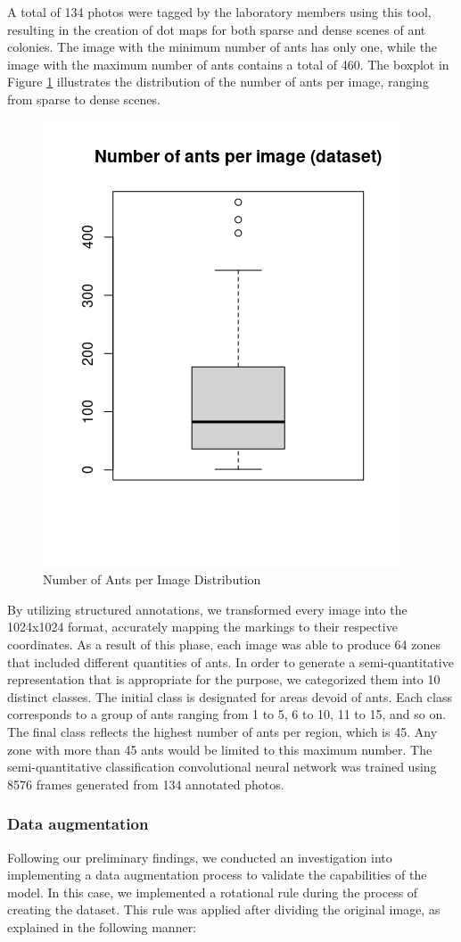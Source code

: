 A total of 134 photos were tagged by the laboratory members using this tool, resulting in the creation of dot maps for both sparse and dense scenes of ant colonies. The image with the minimum number of ants has only one, while the image with the maximum number of ants contains a total of 460. The boxplot in Figure \ref{fig:dataset-boxplot} illustrates the distribution of the number of ants per image, ranging from sparse to dense scenes.

\begin{figure}[h!]
    \centering
    \includegraphics[width = .4\linewidth]{Figures/dataset-boxplot.png}
    \caption{Number of Ants per Image Distribution}
    \label{fig:dataset-boxplot}
\end{figure}

By utilizing structured annotations, we transformed every image into the 1024x1024 format, accurately mapping the markings to their respective coordinates. As a result of this phase, each image was able to produce 64 zones that included different quantities of ants. In order to generate a semi-quantitative representation that is appropriate for the purpose, we categorized them into 10 distinct classes. The initial class is designated for areas devoid of ants. Each class corresponds to a group of ants ranging from 1 to 5, 6 to 10, 11 to 15, and so on. The final class reflects the highest number of ants per region, which is 45. Any zone with more than 45 ants would be limited to this maximum number. The semi-quantitative classification convolutional neural network was trained using 8576 frames generated from 134 annotated photos.

\subsubsection{Data augmentation}

Following our preliminary findings, we conducted an investigation into implementing a data augmentation process to validate the capabilities of the model. In this case, we implemented a rotational rule during the process of creating the dataset. This rule was applied after dividing the original image, as explained in the following manner:

